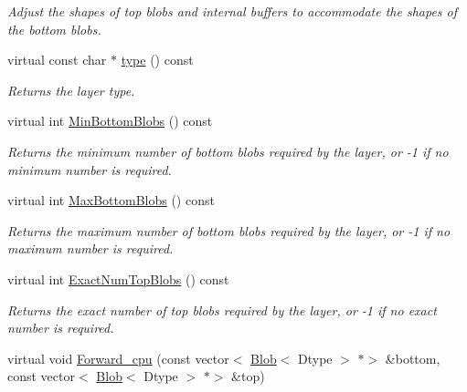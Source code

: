 \begin{DoxyCompactItemize}
\begin{DoxyCompactList}\small\item\em Adjust the shapes of top blobs and internal buffers to accommodate the shapes of the bottom blobs. \end{DoxyCompactList}\item 
\mbox{\label{classcaffe_1_1_bias_layer_a5d2e82265dde2cda44e30c052babef9b}} 
virtual const char $\ast$ \mbox{\hyperlink{classcaffe_1_1_bias_layer_a5d2e82265dde2cda44e30c052babef9b}{type}} () const
\begin{DoxyCompactList}\small\item\em Returns the layer type. \end{DoxyCompactList}\item 
virtual int \mbox{\hyperlink{classcaffe_1_1_bias_layer_ab75a2e05bbb1eb37bed5995288143f67}{Min\+Bottom\+Blobs}} () const
\begin{DoxyCompactList}\small\item\em Returns the minimum number of bottom blobs required by the layer, or -\/1 if no minimum number is required. \end{DoxyCompactList}\item 
virtual int \mbox{\hyperlink{classcaffe_1_1_bias_layer_abdb89e3bc940f999d1d4da83de90a97c}{Max\+Bottom\+Blobs}} () const
\begin{DoxyCompactList}\small\item\em Returns the maximum number of bottom blobs required by the layer, or -\/1 if no maximum number is required. \end{DoxyCompactList}\item 
virtual int \mbox{\hyperlink{classcaffe_1_1_bias_layer_a9552dc137a5bcbdd17bdb3321d678595}{Exact\+Num\+Top\+Blobs}} () const
\begin{DoxyCompactList}\small\item\em Returns the exact number of top blobs required by the layer, or -\/1 if no exact number is required. \end{DoxyCompactList}\item 
\mbox{\label{classcaffe_1_1_bias_layer_a9f3a03691c8084df8d61698d1cbc72b2}} 
virtual void \mbox{\hyperlink{classcaffe_1_1_bias_layer_a9f3a03691c8084df8d61698d1cbc72b2}{Forward\+\_\+cpu}} (const vector$<$ \mbox{\hyperlink{classcaffe_1_1_blob}{Blob}}$<$ Dtype $>$ $\ast$$>$ \&bottom, const vector$<$ \mbox{\hyperlink{classcaffe_1_1_blob}{Blob}}$<$ Dtype $>$ $\ast$$>$ \&top)

\end{DoxyCompactItemize}
